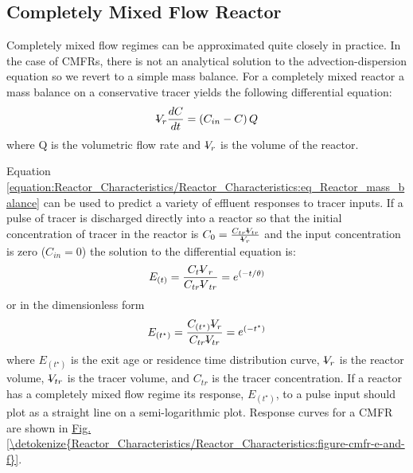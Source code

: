 \documentclass[letterpaper,10pt,english]{sphinxmanual}
\begin{document}
\subsection{Completely Mixed Flow Reactor}
\label{\detokenize{Reactor_Characteristics/Reactor_Characteristics:completely-mixed-flow-reactor}}
Completely mixed flow regimes can be approximated quite closely in practice. In the case of CMFRs, there is not an analytical solution to the advection-dispersion equation so we revert to a simple mass balance. For a completely mixed reactor a mass balance on a conservative tracer yields the following differential equation:
\begin{equation}\label{equation:Reactor_Characteristics/Reactor_Characteristics:eq_Reactor_mass_balance}
\begin{split}\rlap{-} V _{r} \frac{dC}{dt} =\left(C_{in} -C\right)Q\end{split}
\end{equation}
where Q is the volumetric flow rate and \(\rlap{-} V_r\) is the volume of the reactor.

Equation \eqref{equation:Reactor_Characteristics/Reactor_Characteristics:eq_Reactor_mass_balance} can be used to predict a variety of effluent responses to tracer inputs. If a pulse of tracer is discharged directly into a reactor so that the initial concentration of tracer in the reactor is \(C_{0} =\frac{C_{tr} \rlap{-} V _{tr} }{\rlap{-} V _{r} }\) and the input concentration is zero (\(C_{in} = 0\)) the solution to the differential equation is:
\begin{equation}\label{equation:Reactor_Characteristics/Reactor_Characteristics:Reactor_Characteristics/Reactor_Characteristics:2}
\begin{split}E_{\left(t\right)}=\frac{C_t{\rlap{-} V }_r}{C_{tr}{\rlap{-} V }_{tr}}=e^{\left(-t/\theta \right)}\end{split}
\end{equation}
or in the dimensionless form
\begin{equation}\label{equation:Reactor_Characteristics/Reactor_Characteristics:Reactor_Characteristics/Reactor_Characteristics:3}
\begin{split}E_{\left(t^{\star} \right)} =\frac{C_{\left(t^{\star} \right)} \rlap{-} V _{r} }{C_{tr} \rlap{-} V _{tr} } ={\mathop{e}\nolimits^{\left(-t^{\star} \right)}}\end{split}
\end{equation}
where \(E_{\left(t^{\star} \right)}\) is the exit age or residence time distribution curve, \(\rlap{-} V _{r}\) is the reactor volume, \(\rlap{-} V _{tr}\) is the tracer volume, and \(C_{tr}\) is the tracer concentration.  If a reactor has a completely mixed flow regime its response, \(E_{\left(t^{\star} \right)}\), to a pulse input should plot as a straight line on a semi-logarithmic plot. Response curves for a CMFR are shown in \hyperref[\detokenize{Reactor_Characteristics/Reactor_Characteristics:figure-cmfr-e-and-f}]{Fig.\@ \ref{\detokenize{Reactor_Characteristics/Reactor_Characteristics:figure-cmfr-e-and-f}}}.
\end{document}
